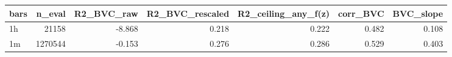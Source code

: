 \begin{tabular}{lrrrrrr}
\toprule
bars & n_eval & R2_BVC_raw & R2_BVC_rescaled & R2_ceiling_any_f(z) & corr_BVC & BVC_slope \\
\midrule
1h & 21158 & -8.868 & 0.218 & 0.222 & 0.482 & 0.108 \\
1m & 1270544 & -0.153 & 0.276 & 0.286 & 0.529 & 0.403 \\
\bottomrule
\end{tabular}
